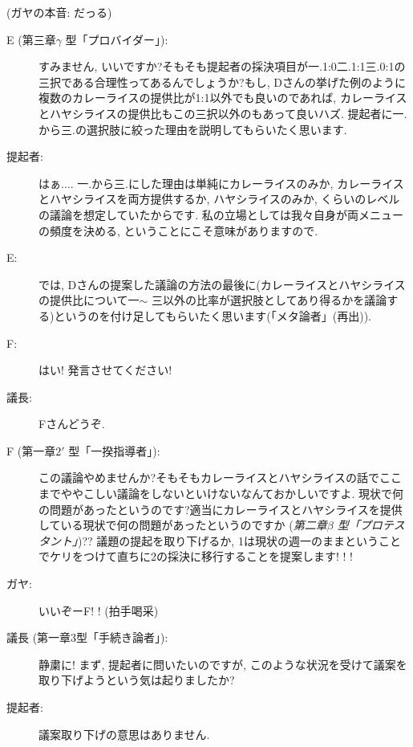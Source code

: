 \documentclass[10pt,b5jsbook,dvips,dvipdfmx,openany]{jsbook}
\theoremstyle{definition}
\begin{document}
\begin{multicols}{2}
\begin{description}
		\end{description}

		(ガヤの本音: だっる)

		\begin{description}

		\item[E (第三章$ \gamma $ 型「プロバイダー」): ]すみません, いいですか?そもそも提起者の採決項目が一.1:0二.1:1三.0:1の三択である合理性ってあるんでしょうか?もし, Dさんの挙げた例のように複数のカレーライスの提供比が1:1以外でも良いのであれば, カレーライスとハヤシライスの提供比もこの三択以外のもあって良いハズ. 提起者に一.から三.の選択肢に絞った理由を説明してもらいたく思います.

		\item[提起者: ]はぁ.... 一.から三.にした理由は単純にカレーライスのみか, カレーライスとハヤシライスを両方提供するか, ハヤシライスのみか, くらいのレベルの議論を想定していたからです. 私の立場としては我々自身が両メニューの頻度を決める, ということにこそ意味がありますので.

		\item[E: ]では, Dさんの提案した議論の方法の最後に(カレーライスとハヤシライスの提供比について一$ \sim $ 三以外の比率が選択肢としてあり得るかを議論する)というのを付け足してもらいたく思います(「メタ論者」(再出)).

		\item[F: ]はい! 発言させてください!

		\item[議長: ]Fさんどうぞ.

		\item[F (第一章$2'$ 型「一揆指導者」): ]この議論やめませんか?そもそもカレーライスとハヤシライスの話でここまでややこしい議論をしないといけないなんておかしいですよ. 現状で何の問題があったというのです?適当にカレーライスとハヤシライスを提供している現状で何の問題があったというのですか (\emph{第二章$ \beta $ 型「プロテスタント」})?? 議題の提起を取り下げるか, 1は現状の週一のままということでケリをつけて直ちに2の採決に移行することを提案します! ! !

		\item[ガヤ: ]いいぞーF! !  (拍手喝采)

		\item[議長 (第一章3型「手続き論者」): ]静粛に! まず, 提起者に問いたいのですが, このような状況を受けて議案を取り下げようという気は起りましたか?

		\item[提起者: ]議案取り下げの意思はありません.


\end{description}
\end{multicols}
\end{document}
